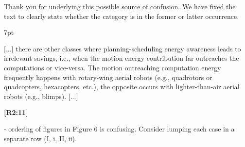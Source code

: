 \documentclass[10pt]{letter}
\newenvironment{formal}{%
  \def\FrameCommand{%
    \hspace{1pt}%
    {\color{red}\vrule width 2pt}%
    {\color{formalshade}\vrule width 4pt}%
    \colorbox{formalshade}%
  }%
  \MakeFramed{\advance\hsize-\width\FrameRestore}%
  \noindent\hspace{-4.55pt}%
  \begin{adjustwidth}{}{7pt}%
  \vspace{2pt}\vspace{2pt}%
}
{%
  \vspace{2pt}\end{adjustwidth}\endMakeFramed%
}
\begin{document}
{\color{blue} 

{\hspace*{-4.5em}{[R2:10]}\vspace*{-1.9em}}

Thank you for underlying this possible source of confusion. We have fixed the text to clearly state whether the category is in the former or latter occurrence.

\begin{formal}
  \color{black} [...] there are other classes where planning-scheduling energy awareness leads to irrelevant savings, i.e., when the motion energy contribution far outreaches the computations or vice-versa. The {\color{blue}motion outreaching computation energy} frequently happens with rotary-wing aerial robots (e.g., quadrotors or quadcopters, hexacopters, etc.){\color{blue}, the opposite occurs with} lighter-than-air aerial robots (e.g., blimps). [...]
  \vspace*{1ex}
\end{formal}}

{\hspace*{-4.5em}\textbf{[R2:11]}\vspace*{-1.9em}}

- ordering of figures in Figure 6 is confusing. Consider lumping each case in a separate row (I, i, II, ii). 
  
\end{document}

